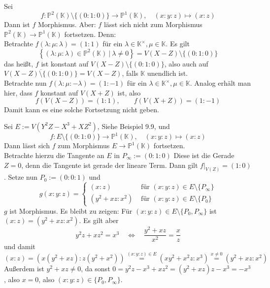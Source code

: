 \documentclass[11pt]{book}
\theoremstyle{nonumberbreak}
\newenvironment{ex}[1][]{\ifthenelse{\equal{#1}{}}{\example}{\example[#1]}\rm}{\endexample}
\begin{document}
\begin{spacing}{1.3}
\begin{ex}
Sei $$f: \mathbb{P}^2(\mathbb{K}) \setminus \{(0:1:0)\} \longrightarrow \mathbb{P}^1(\mathbb{K}), \quad (x:y:z) \mapsto (x:z)$$
Dann ist $f$ Morphismus. Aber: $f$ lässt sich nicht zum Morphismus $\mathbb{P}^2(\mathbb{K}) \longrightarrow \mathbb{P}^1(\mathbb{K})$ fortsetzen. Denn:\\
Betrachte $f(\lambda: \mu : \lambda) = (1:1)$ für ein $\lambda \in \mathbb{K}^{\times}, \mu \in \mathbb{K}$. Es gilt
$$\left\{ ( \lambda: \mu : \lambda) \in \mathbb{P}^2(\mathbb{K}) \ \vert \ \lambda \neq 0 \right\} = V(X-Z) \setminus \{(0:1:0)\}$$
das heißt, $f$ ist konstant auf $V(X-Z) \setminus \{(0:1:0)\}$, also auch auf $\overline{V(X-Z) \setminus \{(0:1:0) \} } = V(X-Z)$, falls $\mathbb{K}$ unendlich ist.\\
Betrachte nun  $f(\lambda: \mu : - \lambda) = (1:-1)$ für ein $\lambda \in \mathbb{K}^{\times}, \mu \in \mathbb{K}$. Analog erhält man hier, dass $f$ konstant auf $V(X+Z)$ ist, also 
$$f(V(X-Z)) = (1:1), \qquad f(V(X+Z)) = (1:-1)$$
Damit kann es eine solche Fortsetzung nicht geben.
\end{ex}

\begin{ex} %

Sei $E:= V(Y^2Z-X^3+XZ^2)$, Siehe Beispiel 9.9, und
$$f: E \setminus \{(0:1:0)\} \longrightarrow \mathbb{P}^1(\mathbb{K}), \quad (x:y:z) \mapsto (x:z)$$
Dann lässt sich $f$ zum Morphismus $E \longrightarrow \mathbb{P}^1(\mathbb{K})$ fortsetzen.\\
Betrachte hierzu die Tangente an $E$ in $P_{\infty}:=(0:1:0)$ Diese ist die Gerade $Z=0$, denn die Tangente ist gerade der lineare Term. Dann gilt $f\vert_{V(Z)} = (1:0)$. Setze nun $P_0:=(0:0:1)$ und
$$g(x:y:z) = \begin{cases} (x:z) & \textrm{ für } (x:y:z) \in E \setminus \{ P_{\infty} \} \\ (y^2+xz:x^2) & \textrm{ für } (x:y:z) \in E \setminus \{ P_0 \} \end{cases}$$
$g$ ist Morphismus. Es bleibt zu zeigen: Für $(x:y:z) \in E \setminus \{ P_0, P_{\infty} \}$ ist 
$(x:z) = ( y^2+xz : x^2).$
Es gilt aber
$$y^2z + xz^2 = x^3 \quad \Longleftrightarrow \quad \frac{y^2+xz}{x^2}=\frac{x}{z}$$
und damit
$$(x:z)=(x(y^2+xz):z(y^2+x^2)) \overset{(x:y:z) \in E}{=} (xy^2+x^2z : x^3) \overset{x \neq 0}{=} (y^2+xz:x^2)$$
Außerdem ist $y^2+xz\neq 0$, da sonst $0=y^2z - x^3+xz^2 = (y^2+xz)z - x^3 = -x^3$, also $x=0$, also $(x:y:z) \in \{P_0, P_{\infty} \}$.
\end{ex}


\end{spacing}
\end{document}
